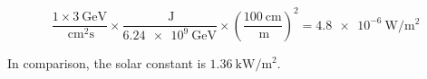 \begin{equation}
  \frac{1\times\SI{3}{\giga\electronvolt}}{\SI{}{\centi\meter\squared\second}}
  \times
  \frac{\SI{}{\joule}}{\SI{6.24e9}{\giga\electronvolt}}
  \times
  \left(\frac{\SI{100}{\centi\meter}}{\SI{}{\meter}}\right)^2
  = \SI{4.8e-6}{\watt\per\meter\squared}
\end{equation}

In comparison, the solar constant is $\SI{1.36}{\kilo\watt\per\meter\squared}$.

